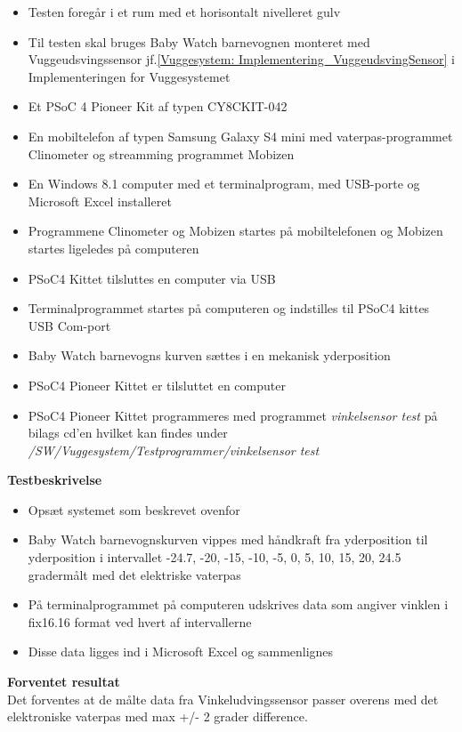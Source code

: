 \begin{itemize}
	\item Testen foregår i et rum med et horisontalt nivelleret gulv
	\item Til testen skal bruges Baby Watch barnevognen monteret med Vuggeudsvingssensor jf.\vref{Vuggesystem: Implementering_VuggeudsvingSensor} i Implementeringen for Vuggesystemet
	\item Et PSoC 4 Pioneer Kit af typen CY8CKIT-042 
	\item En mobiltelefon af typen Samsung Galaxy S4 mini \citep{website:Samsung} med vaterpas-programmet Clinometer \citep{website:Clinometer} og streamming programmet Mobizen \citep{website:Mobizen}
	\item En Windows 8.1 \citep{website:Windows_8_1} computer med et terminalprogram, med USB-porte og Microsoft Excel\citep{website:Excel} installeret 
	\item Programmene Clinometer og Mobizen startes på mobiltelefonen og Mobizen startes ligeledes på computeren
	\item PSoC4 Kittet tilsluttes en computer via USB
	\item Terminalprogrammet startes på computeren og indstilles til PSoC4 kittes USB Com-port
	\item Baby Watch barnevogns kurven sættes i en mekanisk yderposition
	\item PSoC4 Pioneer Kittet er tilsluttet en computer
	\item PSoC4 Pioneer Kittet programmeres med programmet \textit{vinkelsensor test} på bilags cd'en \citep{cd} hvilket kan findes under \textit{/SW/Vuggesystem/Testprogrammer/vinkelsensor test}
\end{itemize}

\textbf{Testbeskrivelse}
\begin{itemize}
\item Opsæt systemet som beskrevet ovenfor
\item Baby Watch barnevognskurven vippes med håndkraft fra yderposition til yderposition i intervallet -24.7, -20, -15, -10, -5, 0, 5, 10, 15, 20, 24.5 grader\footnotemark målt med det elektriske vaterpas 
\item På terminalprogrammet på computeren udskrives data som angiver vinklen i fix16.16 format ved hvert af intervallerne
\item Disse data ligges ind i Microsoft Excel og sammenlignes
\end{itemize}

\textbf{Forventet resultat} \\
Det forventes at de målte data fra Vinkeludvingssensor passer overens med det elektroniske vaterpas med max +/- 2 grader difference.
 \\

